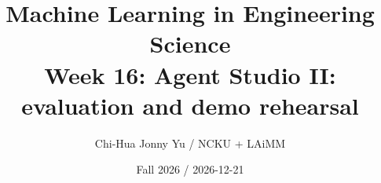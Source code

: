 \documentclass[11pt,oneside]{book}
\begin{document}
\title{Machine Learning in Engineering Science\\\large Week 16: Agent Studio II: evaluation and demo rehearsal}\author{Chi-Hua Jonny Yu / NCKU + LAiMM}\date{Fall 2026 / 2026-12-21}\maketitle

\end{document}
